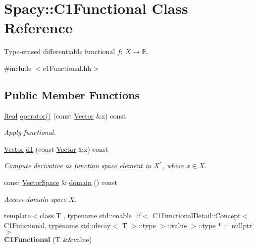 \hypertarget{classSpacy_1_1C1Functional}{\section{Spacy\-:\-:C1\-Functional Class Reference}
\label{classSpacy_1_1C1Functional}
}


Type-\/erased differentiable functional $f:\ X \to \mathbb{R} $.  




{\ttfamily \#include $<$c1\-Functional.\-hh$>$}

\subsection*{Public Member Functions}
\begin{DoxyCompactItemize}
\item 
\hypertarget{classSpacy_1_1C1Functional_a621b710f0c8c583d074f4bf4da3cbb09}{\hyperlink{classSpacy_1_1Real}{Real} \hyperlink{classSpacy_1_1C1Functional_a621b710f0c8c583d074f4bf4da3cbb09}{operator()} (const \hyperlink{classSpacy_1_1Vector}{Vector} \&x) const }\label{classSpacy_1_1C1Functional_a621b710f0c8c583d074f4bf4da3cbb09}

\begin{DoxyCompactList}\small\item\em Apply functional. \end{DoxyCompactList}\item 
\hypertarget{classSpacy_1_1C1Functional_a5953291c58bf20e87ab2bfe26231fe49}{\hyperlink{classSpacy_1_1Vector}{Vector} \hyperlink{classSpacy_1_1C1Functional_a5953291c58bf20e87ab2bfe26231fe49}{d1} (const \hyperlink{classSpacy_1_1Vector}{Vector} \&x) const }\label{classSpacy_1_1C1Functional_a5953291c58bf20e87ab2bfe26231fe49}

\begin{DoxyCompactList}\small\item\em Compute derivative as function space element in $X^*$, where $x\in X$. \end{DoxyCompactList}\item 
\hypertarget{classSpacy_1_1C1Functional_a3ec8df7e7998b557445c907cbd8e80b8}{const \hyperlink{classSpacy_1_1VectorSpace}{Vector\-Space} \& \hyperlink{classSpacy_1_1C1Functional_a3ec8df7e7998b557445c907cbd8e80b8}{domain} () const }\label{classSpacy_1_1C1Functional_a3ec8df7e7998b557445c907cbd8e80b8}

\begin{DoxyCompactList}\small\item\em Access domain space $X$. \end{DoxyCompactList}\item 
\hypertarget{classSpacy_1_1C1Functional_ada8999210df700c93ee7d7c35bdabebc}{{\footnotesize template$<$class T , typename std\-::enable\-\_\-if$<$ C1\-Functional\-Detail\-::\-Concept$<$ C1\-Functional, typename std\-::decay$<$ T $>$\-::type $>$\-::value $>$\-::type $\ast$  = nullptr$>$ }\\{\bfseries C1\-Functional} (T \&\&value)}\label{classSpacy_1_1C1Functional_ada8999210df700c93ee7d7c35bdabebc}


\end{DoxyCompactItemize}

